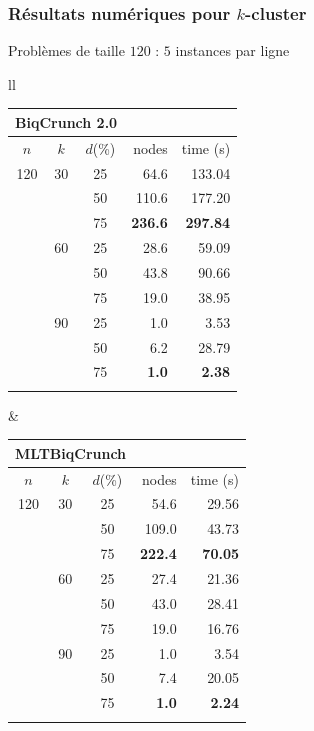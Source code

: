 \documentclass{beamer}
\begin{document}
\begin{frame}
\frametitle{Résultats numériques pour $k$-cluster}

\begin{block}{Problèmes de taille $120$ : $5$ instances par ligne}

\begin{tabular}{ll}
{\scriptsize
\begin{tabular}{cccrr}
\multicolumn{3}{c}{\alert{BiqCrunch 2.0}} & & \\
\hline\noalign{\smallskip}
$n$ & $k$ & $d$(\%) & nodes & time (s) \\
\noalign{\smallskip}\hline\noalign{\smallskip}
120 & 30 & 25 & 64.6 & 133.04 \\
 & & 50 & 110.6 & 177.20 \\
 & & 75 & \textbf{236.6} & \textbf{297.84} \\
 & 60 & 25 & 28.6 & 59.09 \\
 & & 50 & 43.8 & 90.66 \\
 & & 75 & 19.0 & 38.95 \\
 & 90 & 25 & 1.0 & 3.53 \\
 & & 50 & 6.2 & 28.79 \\
 & & 75 & \textbf{1.0} & \textbf{2.38} \\
\noalign{\smallskip}\hline
\end{tabular}
}

&
{\scriptsize
\begin{tabular}{cccrr}
\multicolumn{3}{c}{\alert{MLTBiqCrunch}} & & \\
\hline\noalign{\smallskip}
$n$ & $k$ & $d$(\%) & nodes & time (s) \\
\noalign{\smallskip}\hline\noalign{\smallskip}
120 & 30 & 25 & 54.6 & 29.56 \\
 & & 50 & 109.0 & 43.73 \\
 & & 75 & \textbf{222.4} & \textbf{70.05} \\
 & 60 & 25 & 27.4 & 21.36 \\
 & & 50 & 43.0 & 28.41 \\
 & & 75 & 19.0 & 16.76 \\
 & 90 & 25 & 1.0 & 3.54 \\
 & & 50 & 7.4 & 20.05 \\
 & & 75 & \textbf{1.0} & \textbf{2.24} \\
\noalign{\smallskip}\hline
\end{tabular}
}
\end{tabular}
\end{block}


\end{frame}
\end{document}
